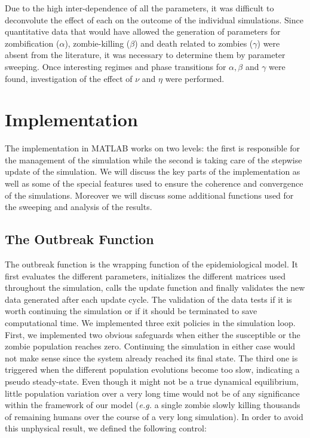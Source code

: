 \documentclass[11pt]{article} %
\begin{document}
Due to the high inter-dependence of all the parameters, it was difficult to deconvolute the effect of each on the outcome of the individual simulations. Since quantitative data that would have allowed the generation of parameters for zombification ($\alpha$), zombie-killing ($\beta$) and death related to zombies ($\gamma$) were absent from the literature, it was necessary to determine them by parameter sweeping. Once interesting regimes and phase transitions for $\alpha, \beta$ and $\gamma$ were found, investigation of the effect of $\nu$ and $\eta$ were performed.


\newpage
\section{Implementation}\indent

The implementation in MATLAB works on two levels: the first is responsible for the management of the simulation while the second is taking care of the stepwise update of the simulation. We will discuss the key parts of the implementation as well as some of the special features used to ensure the coherence and convergence of the simulations. Moreover we will discuss some additional functions used for the sweeping and analysis of the results.


\subsection{The Outbreak Function}\indent
\label{outbreakimpl}

The outbreak function is the wrapping function of the epidemiological model. It first evaluates the different parameters, initializes the different matrices used throughout the simulation, calls the update function and finally validates the new data generated after each update cycle. The validation of the data tests if it is worth continuing the simulation or if it should be terminated to save computational time. We implemented three exit policies in the simulation loop. First, we implemented two obvious safeguards when either the susceptible or the zombie population reaches zero. Continuing the simulation in either case would not make sense since the system already reached its final state. The third one is triggered when the different population evolutions become too slow, indicating a pseudo steady-state. Even though it might not be a true dynamical equilibrium, little population variation over a very long time would not be of any significance within the framework of our model (\textit{e.g.} a single zombie slowly killing thousands of remaining humans over the course of a very long simulation). In order to avoid this unphysical result, we defined the following control:
\end{document}
